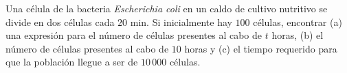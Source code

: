 \item Una célula de la bacteria \textit{Escherichia coli} en un caldo de cultivo nutritivo se divide en dos células cada $20 \text{ min}$. Si inicialmente hay $100$ células, encontrar (a) una expresión para el número de células presentes al cabo de $t$ horas, (b) el número de células presentes al cabo de $10$ horas y (c) el tiempo requerido para que la población llegue a ser de $10\,000$ células.
